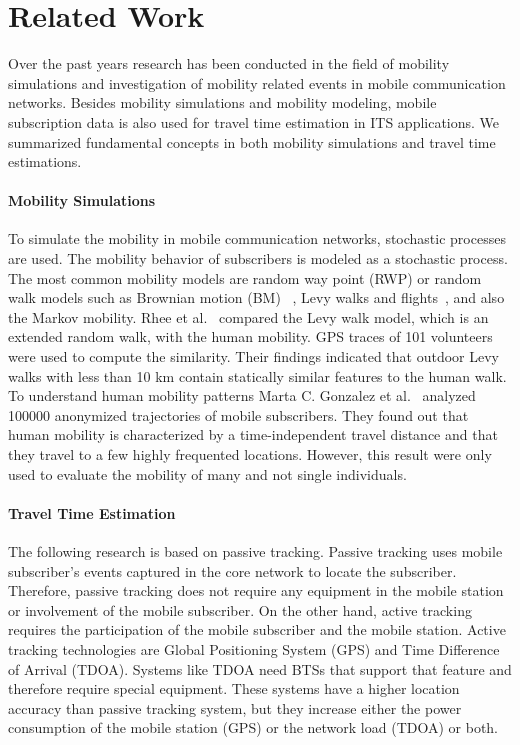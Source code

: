\section{Related Work}
Over the past years research has been conducted in the field of mobility simulations and investigation of mobility related events in mobile communication networks. Besides mobility simulations and mobility modeling, mobile subscription data is also used for travel time estimation in ITS applications. We summarized fundamental concepts in both mobility simulations and travel time estimations.
\paragraph{Mobility Simulations}
To simulate the mobility in mobile communication networks, stochastic processes are used. The mobility behavior of subscribers is modeled as a stochastic process. The most common mobility models are random way point (RWP) or random walk models such as Brownian motion (BM)~\cite{Klafter1996} , Levy walks and flights~\cite{Camp2002}, and also the Markov mobility\cite{Bai2004}.
Rhee et al.~\cite{Rhee2011} compared the Levy walk model, which is an extended random walk, with the human mobility. GPS traces of 101 volunteers were used to compute the similarity. Their findings indicated that outdoor Levy walks with less than 10 km contain statically similar features to the human walk.
To understand human mobility patterns Marta C. Gonzalez et al.~\cite{Gonzalez2008} analyzed 100000 anonymized trajectories of mobile subscribers. They found out that human mobility is characterized by a time-independent travel distance and that they travel to a few highly frequented locations. However, this result were only used to evaluate the mobility of many and not single individuals.
\paragraph{Travel Time Estimation}
The following research is based on passive tracking. Passive tracking uses mobile subscriber's events captured in the core network to locate the subscriber. Therefore, passive tracking does not require any equipment in the mobile station or involvement of the mobile subscriber. On the other hand, active tracking requires the participation of the mobile subscriber and the mobile station. Active tracking technologies are Global Positioning System (GPS) and Time Difference of Arrival (TDOA). Systems like TDOA need BTSs that support that feature and therefore require special equipment. These systems have a higher location accuracy than passive tracking system, but they increase either the power consumption of the mobile station (GPS) or the network load (TDOA) or both.\newline

